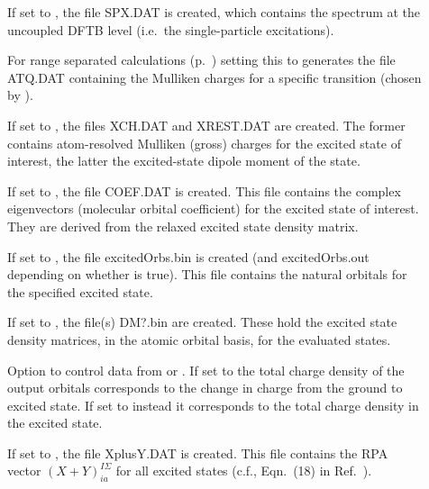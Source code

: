 \begin{description}
  \item[] If set to , the file SPX.DAT is
    created, which contains the spectrum at the uncoupled DFTB level (i.e.\ the
    single-particle excitations).

  \item[] For range separated calculations
    (p.~) setting this to  generates the file
    ATQ.DAT containing the Mulliken charges for a specific transition (chosen by
    ).

  \item[] If set to , the files XCH.DAT and XREST.DAT
    are created. The former contains atom-resolved Mulliken (gross) charges for
    the excited state of interest, the latter the excited-state dipole moment of
    the state.

  \item[] If set to , the file COEF.DAT is
    created. This file contains the complex eigenvectors (molecular orbital
    coefficient) for the excited state of interest. They are derived from the
    relaxed excited state density matrix.

  \item[] If set to , the file excitedOrbs.bin is
    created (and excitedOrbs.out depending on whether  is
    true). This file contains the natural orbitals for the specified excited
    state.

  \item[] If set to , the file(s) DM?.bin are
    created. These hold the excited state density matrices, in the atomic
    orbital basis, for the evaluated states.

  \item[] Option to control data from
     or . If set to  the
    total charge density of the output orbitals corresponds to the change in
    charge from the ground to excited state. If set to  instead it
    corresponds to the total charge density in the excited state.

  \item[] If set to , the file XplusY.DAT is
    created. This file contains the RPA vector $(X+Y)^{I\Sigma}_{ia}$ for all
    excited states (c.f., Eqn.~(18) in Ref.~\cite{heringer2007aes}).


\end{description}
